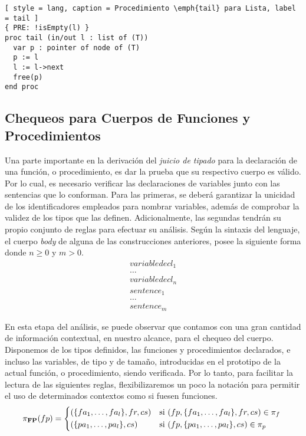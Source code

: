 \begin{lstlisting}[ style = lang, caption = Procedimiento \emph{tail} para Lista, label = tail ]
{ PRE: !isEmpty(l) }
proc tail (in/out l : list of (T))
  var p : pointer of node of (T)
  p := l
  l := l->next
  free(p)
end proc
\end{lstlisting}

\subsection{Chequeos para Cuerpos de Funciones y Procedimientos}

Una parte importante en la derivación del \textit{juicio de tipado} para la declaración de una función, o procedimiento, es dar la prueba que su respectivo cuerpo es válido.
Por lo cual, es necesario verificar las declaraciones de variables junto con las sentencias que lo conforman.
Para las primeras, se deberá garantizar la unicidad de los identificadores empleados para nombrar variables, además de comprobar la validez de los tipos que las definen.
Adicionalmente, las segundas tendrán su propio conjunto de reglas para efectuar su análisis.
Según la sintaxis del lenguaje, el cuerpo \textit{body} de alguna de las construcciones anteriores, posee la siguiente forma donde $n \geq 0$ y $m > 0$.
\begin{gather*}
variabledecl_1
\\
\ldots
\\
variabledecl_n
\\
sentence_1
\\
\ldots
\\
sentence_m
\end{gather*}

En esta etapa del análisis, se puede observar que contamos con una gran cantidad de información contextual, en nuestro alcance, para el chequeo del cuerpo.
Disponemos de los tipos definidos, las funciones y procedimientos declarados, e incluso las variables, de tipo y de tamaño, introducidas en el prototipo de la actual función, o procedimiento, siendo verificada.
Por lo tanto, para facilitar la lectura de las siguientes reglas, flexibilizaremos un poco la notación para permitir el uso de determinados contextos como si fuesen funciones.
\begin{align*}
\PI{FP}(fp) =
\begin{cases*}
(\{ fa_1, \ldots, fa_l \}, fr, cs )
&
si $(fp, \{ fa_1, \ldots, fa_l \}, fr, cs ) \in \pi_{f}$
\\
(\{ pa_1, \ldots, pa_l \}, cs )
&
si $(fp, \{ pa_1, \ldots, pa_l \}, cs ) \in \pi_{p}$
\end{cases*}
\end{align*}

